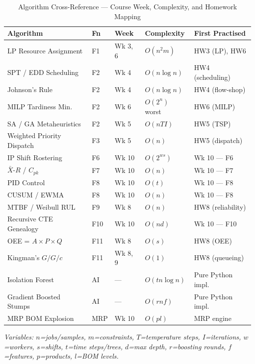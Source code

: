 \documentclass[11pt]{article}
\begin{document}
\begin{table}[H]\centering\small
\caption{Algorithm Cross-Reference --- Course Week, Complexity, and Homework Mapping}
\begin{tabularx}{\textwidth}{@{} L{3.2cm} l l l L{3.5cm} @{}}
\toprule
\textbf{Algorithm} & \textbf{Fn} & \textbf{Week} & \textbf{Complexity} & \textbf{First Practised} \\
\midrule
LP Resource Assignment         & F1  & Wk 3, 6 & $O(n^2 m)$     & HW3 (LP), HW6 \\
SPT / EDD Scheduling           & F2  & Wk 4    & $O(n \log n)$  & HW4 (scheduling) \\
Johnson's Rule                 & F2  & Wk 4    & $O(n \log n)$  & HW4 (flow-shop) \\
MILP Tardiness Min.            & F2  & Wk 6    & $O(2^n)$ worst & HW6 (MILP) \\
SA / GA Metaheuristics         & F2  & Wk 5    & $O(nTI)$       & HW5 (TSP) \\
Weighted Priority Dispatch     & F3  & Wk 5    & $O(n)$         & HW5 (dispatch) \\
IP Shift Rostering             & F6  & Wk 10   & $O(2^{ws})$    & Wk 10 --- F6 \\
$\bar{X}$-$R$ / $C_{pk}$      & F7  & Wk 10   & $O(n)$         & Wk 10 --- F7 \\
PID Control                    & F8  & Wk 10   & $O(t)$         & Wk 10 --- F8 \\
CUSUM / EWMA                   & F8  & Wk 10   & $O(n)$         & Wk 10 --- F8 \\
MTBF / Weibull RUL             & F9  & Wk 8    & $O(n)$         & HW8 (reliability) \\
Recursive CTE Genealogy        & F10 & Wk 10   & $O(nd)$        & Wk 10 --- F10 \\
OEE = $A \times P \times Q$   & F11 & Wk 8    & $O(s)$         & HW8 (OEE) \\
Kingman's $G/G/c$              & F11 & Wk 8, 9 & $O(1)$         & HW8 (queueing) \\
Isolation Forest               & AI  & ---     & $O(tn\log n)$  & Pure Python impl. \\
Gradient Boosted Stumps        & AI  & ---     & $O(rnf)$       & Pure Python impl. \\
MRP BOM Explosion              & MRP & Wk 10   & $O(pl)$        & MRP engine \\
\bottomrule
\end{tabularx}

\noindent\small\textit{Variables: $n$=jobs/samples, $m$=constraints, $T$=temperature steps, $I$=iterations, $w$=workers, $s$=shifts, $t$=time steps/trees, $d$=max depth, $r$=boosting rounds, $f$=features, $p$=products, $l$=BOM levels.}
\end{table}
\end{document}
